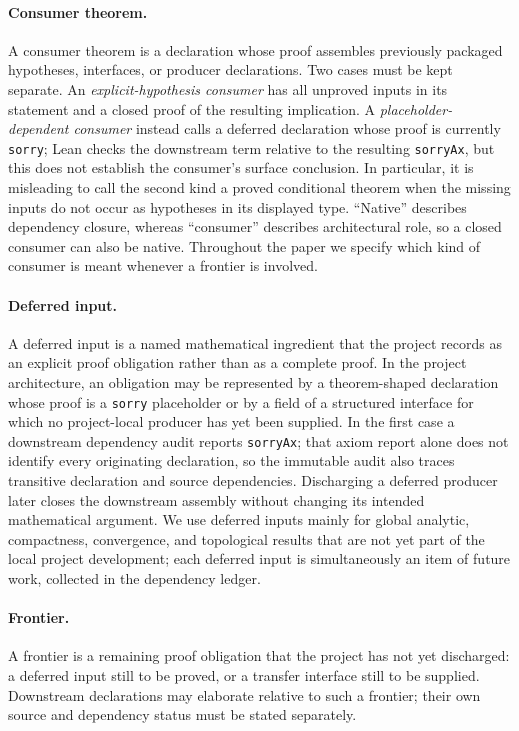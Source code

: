 \documentclass[11pt]{article}
\theoremstyle{plain}
\theoremstyle{definition}
\theoremstyle{remark}
\begin{document}
\paragraph{Consumer theorem.}
A consumer theorem is a declaration whose proof assembles previously packaged
hypotheses, interfaces, or producer declarations.  Two cases must be kept
separate.  An \emph{explicit-hypothesis consumer} has all unproved inputs in
its statement and a closed proof of the resulting implication.  A
\emph{placeholder-dependent consumer} instead calls a deferred declaration
whose proof is currently \texttt{sorry}; Lean checks the downstream term
relative to the resulting \texttt{sorryAx}, but this does not establish the
consumer's surface conclusion.  In particular, it is misleading to call the
second kind a proved conditional theorem when the missing inputs do not occur
as hypotheses in its displayed type.  ``Native'' describes dependency
closure, whereas ``consumer'' describes architectural role, so a closed
consumer can also be native.  Throughout the paper we specify which kind of
consumer is meant whenever a frontier is involved.

\paragraph{Deferred input.}
A deferred input is a named mathematical ingredient that the project records as
an explicit proof obligation rather than as a complete proof.  In the project
architecture, an obligation may be represented by a theorem-shaped declaration
whose proof is a \texttt{sorry} placeholder or by a field of a structured
interface for which no project-local producer has yet been supplied.  In the
first case a downstream dependency audit reports \texttt{sorryAx}; that
axiom report alone does not identify every originating declaration, so the
immutable audit also traces transitive declaration and source dependencies.
Discharging a deferred producer later closes the downstream assembly without
changing its intended mathematical argument.  We use deferred inputs mainly for global
analytic, compactness, convergence, and topological results that are not yet
part of the local project development; each deferred input is simultaneously an
item of future work, collected in the dependency ledger.

\paragraph{Frontier.}
A frontier is a remaining proof obligation that the project has not yet
discharged: a deferred input still to be proved, or a transfer interface
still to be supplied.  Downstream declarations may elaborate relative to such
a frontier; their own source and dependency status must be stated separately.
\end{document}
